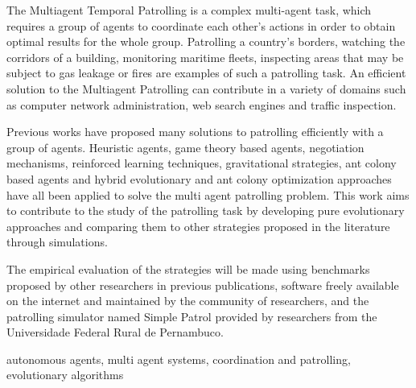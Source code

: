 The Multiagent Temporal Patrolling is a complex multi-agent task, which requires 
a group of agents to coordinate each other’s actions in order to obtain optimal 
results for the whole group. Patrolling a country’s borders, watching the 
corridors of a building, monitoring maritime fleets, inspecting areas that may be 
subject to gas leakage or fires are examples of such a patrolling task. An 
efficient solution to the Multiagent Patrolling can contribute in a variety of 
domains such as computer network administration, web search engines and traffic 
inspection.

Previous works have proposed many solutions to patrolling efficiently with a group 
of agents. Heuristic agents, game theory based agents, negotiation mechanisms, 
reinforced learning techniques, gravitational strategies, 
ant colony based agents and hybrid evolutionary and ant colony optimization approaches have all been applied to 
solve the multi agent patrolling problem. This work aims to contribute to the study 
of the patrolling task by developing pure evolutionary approaches and comparing them 
to other strategies proposed in the literature through simulations.

The empirical evaluation of the strategies will be made using benchmarks proposed by 
other researchers in previous publications, software freely available on the 
internet and maintained by the community of researchers, and the patrolling simulator 
named Simple Patrol provided by researchers from the 
Universidade Federal Rural de Pernambuco.

\begin{keywords}
autonomous agents, multi agent systems, coordination and patrolling, evolutionary 
algorithms
\end{keywords}